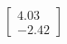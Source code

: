 \documentclass[preview]{standalone}
\begin{document}
\begin{align*}
\begin{bmatrix} 4.03 \\ -2.42 \end{bmatrix}
\end{align*}
\end{document}
